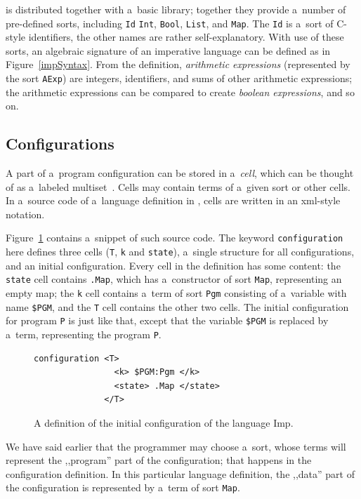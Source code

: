 \documentclass{fithesis3}
\begin{document}
\K is distributed together with a~basic library; together they provide a~number of pre-defined sorts, including \texttt{Id} \texttt{Int}, \texttt{Bool}, \texttt{List}, and \texttt{Map}. The \texttt{Id} is a~sort of C-style identifiers, the other names are rather self-explanatory. With use of these sorts, an algebraic signature of an imperative language can be defined as in Figure~\ref{impSyntax}. From the definition, \textit{arithmetic expressions} (represented by the sort \texttt{AExp}) are integers, identifiers, and sums of other arithmetic expressions; the arithmetic expressions can be compared to create \textit{boolean expressions}, and so on.

\subsection{Configurations}

A part of a~program configuration can be stored in a~\textit{cell}, which can be thought of as a~labeled multiset~\cite{hathhorn-ellison-rosu-2015-pldi}. Cells may contain terms of a~given sort or other cells. In a~source code of a~language definition in \K, cells are written in an xml-style notation.

Figure~\ref{impConfiguration} contains a~snippet of such source code. The keyword \texttt{configuration} here defines three cells (\texttt{T}, \texttt{k} and \texttt{state}), a~single structure for all configurations, and an initial configuration. Every cell in the definition has some content: the \texttt{state} cell contains \lstinline{.Map}, which has a~constructor of sort \texttt{Map}, representing an empty map; the \texttt{k} cell contains a~term of sort \texttt{Pgm} consisting of a~variable with name \texttt{\$PGM}, and the \texttt{T} cell contains the other two cells. The initial configuration for program \texttt{P} is just like that, except that the variable \texttt{\$PGM} is replaced by a~term, representing the program \texttt{P}.

\begin{figure}
\begin{lstlisting}
configuration <T>
                <k> $PGM:Pgm </k>
                <state> .Map </state>
              </T>
\end{lstlisting}
\caption{A definition of the initial configuration of the language Imp.}
\label{impConfiguration}
\end{figure}

We have said earlier that the programmer may choose a~sort, whose terms will represent the ,,program'' part of the configuration; that happens in the configuration definition. In this particular language definition, the ,,data'' part of the configuration is represented by a~term of sort \texttt{Map}. %
\end{document}
